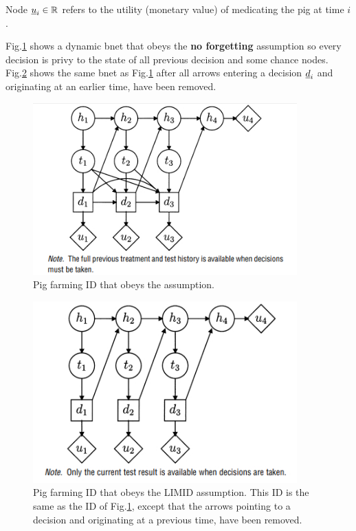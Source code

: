 \begin{itemize}
Node $\rvu_i\in \RR$ refers to the utility (monetary value)
of medicating the pig at time $i$.


Fig.\ref{fig-pre-limid} shows a dynamic bnet that
obeys the {\bf no forgetting} assumption so every decision is
privy to the state of all previous decision and some chance nodes.
Fig.\ref{fig-post-limid} shows the same bnet as
Fig.\ref{fig-pre-limid} after all arrows entering a decision $\rvd_i$ and originating at an earlier time, have been removed.



\begin{figure}[h!]
\centering
\includegraphics[width=4in]
{influ-diag/pre-limid.jpg}
\caption{Pig farming ID that obeys the 
assumption.
}
\label{fig-pre-limid}
\end{figure}


\begin{figure}[h!]
\centering
\includegraphics[width=4in]
{influ-diag/post-limid.jpg}
\caption{Pig farming ID that obeys the  LIMID
assumption. This ID is the same as the ID of Fig.\ref{fig-pre-limid},
except that the arrows pointing to a decision and originating at a previous time, have been removed.}
\label{fig-post-limid}
\end{figure}


\end{itemize}
